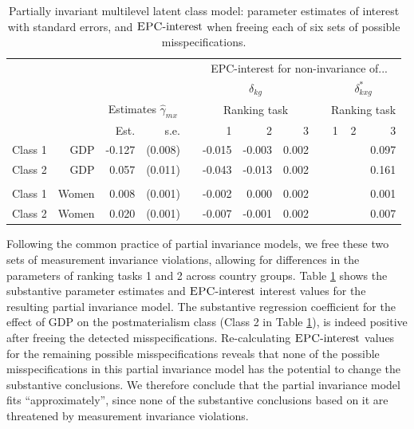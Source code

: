 \documentclass[letterpaper,12pt]{article}
\newcommand{\da}{\textrm{{\sc {EPC}}-interest}}
\begin{document}
\begin{table}\begin{small}
	\caption{
	Partially invariant  multilevel latent class model: parameter estimates of interest with standard errors, and  $\da{}$ when freeing each of six sets of possible misspecifications. 
	\label{tab:epc-interest-model2}}
	\begin{tabular}{lrrrrrrrrrrr}
	\hline
		&&&&&\multicolumn{7}{c}{EPC-interest for non-invariance of...}\\
	&&&&&\multicolumn{3}{c}{$\delta_{k g}$} && \multicolumn{3}{c}{$\delta^{*}_{k x g}$}\\
			\hline
		&&\multicolumn{2}{c}{Estimates $\hat{\gamma}_{mx}$}&&\multicolumn{3}{c}{Ranking task} && \multicolumn{3}{c}{Ranking task}\\
\cline{3-4}\cline{6-8}\cline{10-12}
			&	&	Est.&	s.e.&	&	1  &	2  &	3  &&	  1&	2 &	3\\
				\hline
Class 1&	GDP&	-0.127&	(0.008)&	&	-0.015&	-0.003&	0.002&&	&	&	0.097\\
Class 2&	GDP&	0.057&	(0.011)&	&	-0.043&	-0.013&	0.002&&	&	&	0.161\\
\\
Class 	1&	Women&	0.008&	(0.001)&	&	-0.002&	0.000&	0.002&	&&	&	0.001\\
Class 	2&	Women&	0.020&	(0.001)&	&	-0.007&	-0.001&	0.002&	&&	&	0.007\\
\hline
	\end{tabular}
\end{small}\end{table}

Following the common practice of partial invariance models, we free these two sets of measurement invariance violations, allowing for differences in the parameters of ranking tasks 1 and 2 across country groups. Table \ref{tab:epc-interest-model2} shows the substantive parameter estimates and $\da{}$ interest values for the resulting partial invariance model. The substantive  regression coefficient for the effect of GDP on the postmaterialism class (Class 2 in Table \ref{tab:epc-interest-model2}), is indeed positive after freeing the detected misspecifications. Re-calculating $\da{}$ values for the remaining possible misspecifications reveals that none of the possible misspecifications in this partial invariance model has the potential to change the substantive conclusions. We therefore conclude that the partial invariance model fits ``approximately'', since none of the substantive conclusions based on it are threatened by measurement invariance violations.
\end{document}
